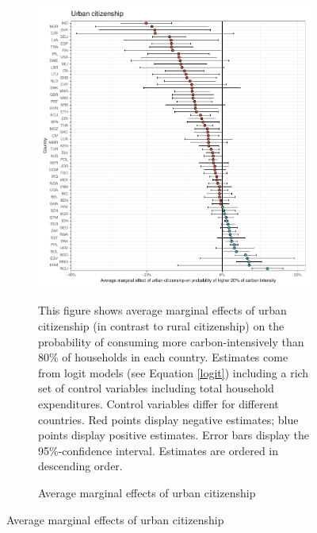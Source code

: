 \begin{figure}[ht!]\ContinuedFloat
   \centering
   \begin{subfigure}[b]{\textwidth}
   \centering
   \includegraphics{1_Figures/Analysis_Logit_Models_Marginal_Effects/Average_Marginal_Effects_affected_upper_80_urban_01_2017B.pdf}
   \caption{Average marginal effects of urban citizenship} \label{fig:Logit_ME_urban}
   \begin{subcaption2}
     This figure shows average marginal effects of urban citizenship (in contrast to rural citizenship) on the probability of consuming more carbon-intensively than 80\% of households in each country. Estimates come from logit models (see Equation \ref{logit}) including a rich set of control variables including total household expenditures. Control variables differ for different countries. Red points display negative estimates; blue points display positive estimates. Error bars display the 95\%-confidence interval. Estimates are ordered in descending order.
   \end{subcaption2}
   \end{subfigure}
 \end{figure}
 \clearpage

